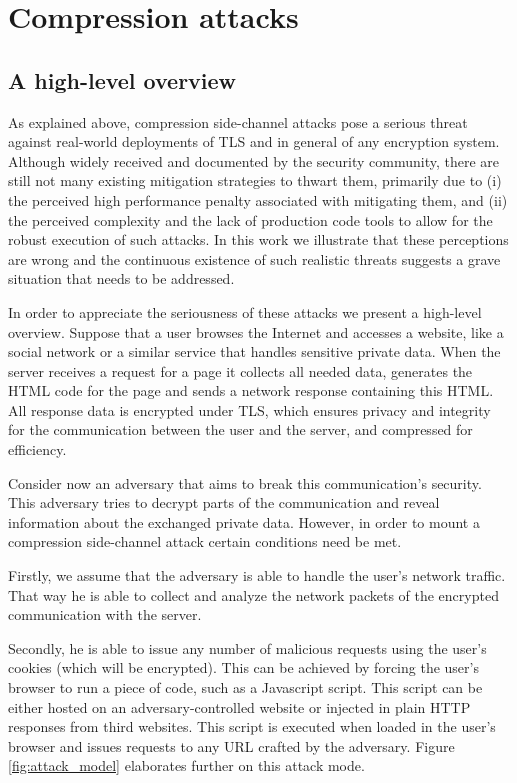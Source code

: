 \section{Compression attacks}\label{sec:attack}

\subsection{A high-level overview}\label{subsec:example}
As explained above, compression side-channel attacks pose a serious threat
against real-world deployments of TLS and in general of any encryption system.
Although widely received and documented by the security community, there are
still not many existing mitigation strategies to thwart them, primarily due to
(i) the perceived high performance penalty associated with mitigating them, and
(ii) the perceived complexity and the lack of production code tools to allow for
the robust execution of such attacks. In this work we illustrate that these
perceptions are wrong and the continuous existence of such realistic threats
suggests a grave situation that needs to be addressed.

In order to appreciate the seriousness of these attacks we present a high-level
overview. Suppose that a user browses the Internet and accesses a website, like
a social network or a similar service that handles sensitive private data. When
the server receives a request for a page it collects all needed data, generates
the HTML code for the page and sends a network response containing this HTML.
All response data is encrypted under TLS, which ensures privacy and integrity
for the communication between the user and the server, and compressed for
efficiency.

Consider now an adversary that aims to break this communication's security.
This adversary tries to decrypt parts of the communication and reveal
information about the exchanged private data. However, in order to mount a
compression side-channel attack certain conditions need be met.

Firstly, we assume that the adversary is able to handle the user's network
traffic. That way he is able to collect and analyze the network packets of the
encrypted communication with the server.

Secondly, he is able to issue any number of malicious requests using the user's
cookies (which will be encrypted). This can be achieved by forcing the user's
browser to run a piece of code, such as a Javascript script. This script can be
either hosted on an adversary-controlled website or injected in plain HTTP
responses from third websites. This script is executed when loaded in the user's
browser and issues requests to any URL crafted by the adversary. Figure
\ref{fig:attack_model} elaborates further on this attack mode.

